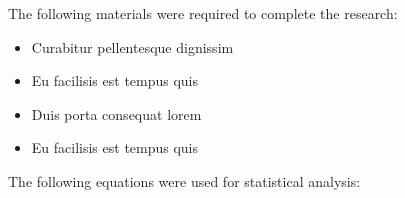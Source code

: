 \documentclass[landscape,a0paper,fontscale=0.33]{baposter} %
\newcommand{\compresslist}{ %
\setlength{\itemsep}{1pt}
\setlength{\parskip}{0pt}
\setlength{\parsep}{0pt}
}
\begin{document}
\begin{poster}
{The following materials were required to complete the research:

\begin{itemize}\compresslist
\item Curabitur pellentesque dignissim
\item Eu facilisis est tempus quis
\item Duis porta consequat lorem
\item Eu facilisis est tempus quis
\end{itemize}

The following equations were used for statistical analysis:
}




\end{poster}
\end{document}
